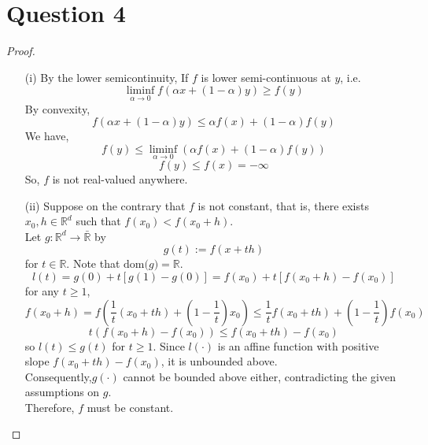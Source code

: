 \documentclass{article}
\begin{document}
\section*{Question 4}
    \begin{proof}
        \indent
        \begin{itemize}
            \item[(i)]
            By the lower semicontinuity, If $f$ is lower semi-continuous at $y$, i.e.
            $$\liminf_{\alpha \to 0} f(\alpha x + (1-\alpha)y) \geqslant f(y)$$
            By convexity,
            $$f(\alpha x + (1-\alpha)y) \leqslant \alpha f(x) + (1-\alpha) f(y)$$
            We have,
            $$f(y)\leqslant \liminf_{\alpha \to 0}\left(\alpha f(x) + (1-\alpha) f(y)\right)$$
            $$f(y) \leqslant f(x) = -\infty$$
            So, $f$ is not real-valued anywhere. 
            \item[{(ii)}]
            Suppose on the contrary that $f$ is not constant, that is, there exists $x_0, h \in \mathbb{R}^d$ such that $f(x_0) < f(x_0+h)$.\\
            Let $g:\mathbb{R}^d \to \bar{\mathbb{R}}$ by $$g(t):=f(x+th)$$
            for $t\in \mathbb{R}$. Note that $\text{dom(}g\text{)}=\mathbb{R}$.
            $$l(t) = g(0)+t[g(1)-g(0)] = f(x_0)+t[f(x_0+h)-f(x_0)]$$
            for any $t\geqslant 1$,
            $$f(x_0+h) = f\left(\frac{1}{t}(x_0+th)+\left(1-\frac{1}{t}\right)x_0 \right) \leqslant \frac{1}{t}f(x_0+th)+\left(1-\frac{1}{t}\right)f(x_0)$$
            $$t(f(x_0+h)-f(x_0))\leqslant f(x_0+th)-f(x_0)$$
            so $l(t) \leqslant g(t)$ for $t \geqslant 1$.
            Since $l(\cdot)$ is an affine function with positive slope
            $f(x_0+th)-f(x_0)$, it is unbounded above.\\
            Consequently,$g(\cdot)$ cannot be bounded above
            either, contradicting the given assumptions on $g$.\\
            Therefore, $f$ must be constant.
        \end{itemize}

    \end{proof}

\end{document}
